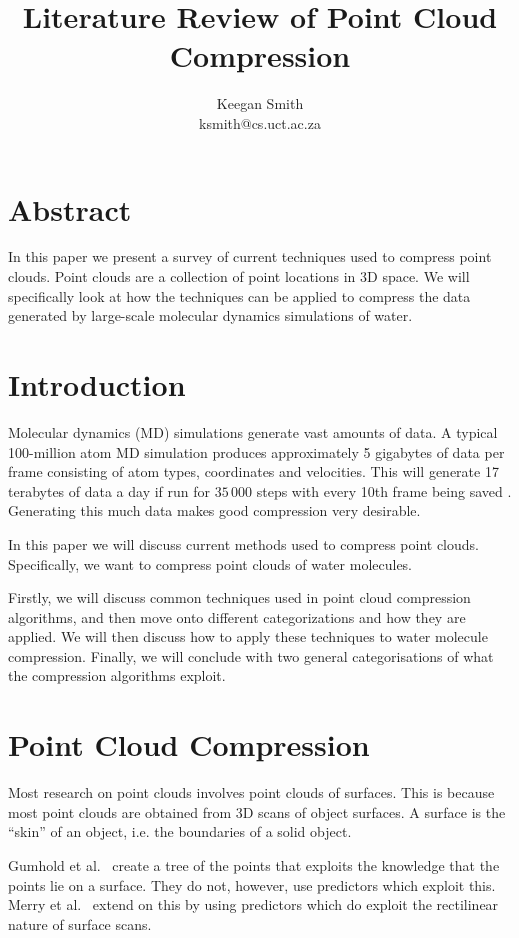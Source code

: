 \documentclass[11pt,twocolumn]{article}
\title{Literature Review of Point Cloud Compression}
\author{Keegan Smith\\ksmith@cs.uct.ac.za}
\begin{document}
\maketitle

\section*{Abstract}
In this paper we present a survey of current techniques used to compress point
clouds. Point clouds are a collection of point locations in 3D space. We will
specifically look at how the techniques can be applied to compress the data
generated by large-scale molecular dynamics simulations of water.

\section{Introduction}

Molecular dynamics (MD) simulations generate vast amounts of data. A typical
100-million atom MD simulation produces approximately 5 gigabytes of data per
frame consisting of atom types, coordinates and velocities. This will generate
17 terabytes of data a day if run for $35\,000$ steps with every 10th frame
being saved \cite{omeltchenko2000sls}. Generating this much data makes good
compression very desirable.

In this paper we will discuss current methods used to compress point
clouds. Specifically, we want to compress point clouds of water molecules.

Firstly, we will discuss common techniques used in point cloud compression
algorithms, and then move onto different categorizations and how they are
applied. We will then discuss how to apply these techniques to water molecule
compression. Finally, we will conclude with two general categorisations of
what the compression algorithms exploit.

\section{Point Cloud Compression}

Most research on point clouds involves point clouds of surfaces. This is
because most point clouds are obtained from 3D scans of object surfaces. A
surface is the ``skin'' of an object, i.e. the boundaries of a solid object.

Gumhold et al.~\cite{gumholdcomp} create a tree of the points that exploits
the knowledge that the points lie on a surface. They do not, however, use
predictors which exploit this. Merry et al.~\cite{merrycomp} extend on this by
using predictors which do exploit the rectilinear nature of surface scans.
\end{document}
